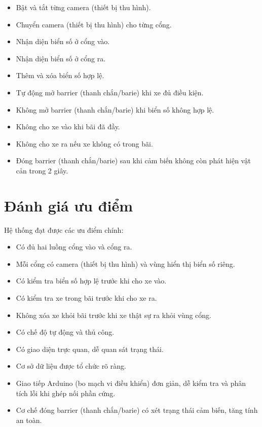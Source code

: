 \documentclass[a4paper,14pt]{extreport}
\begin{document}
\begin{itemize}[leftmargin=2em]
  \item Bật và tắt từng camera (thiết bị thu hình).
  \item Chuyển camera (thiết bị thu hình) cho từng cổng.
  \item Nhận diện biển số ở cổng vào.
  \item Nhận diện biển số ở cổng ra.
  \item Thêm và xóa biển số hợp lệ.
  \item Tự động mở barrier (thanh chắn/barie) khi xe đủ điều kiện.
  \item Không mở barrier (thanh chắn/barie) khi biển số không hợp lệ.
  \item Không cho xe vào khi bãi đã đầy.
  \item Không cho xe ra nếu xe không có trong bãi.
  \item Đóng barrier (thanh chắn/barie) sau khi cảm biến không còn phát hiện vật cản trong 2 giây.
\end{itemize}

\section{Đánh giá ưu điểm}

Hệ thống đạt được các ưu điểm chính:

\begin{itemize}[leftmargin=2em]
  \item Có đủ hai luồng cổng vào và cổng ra.
  \item Mỗi cổng có camera (thiết bị thu hình) và vùng hiển thị biển số riêng.
  \item Có kiểm tra biển số hợp lệ trước khi cho xe vào.
  \item Có kiểm tra xe trong bãi trước khi cho xe ra.
  \item Không xóa xe khỏi bãi trước khi xe thật sự ra khỏi vùng cổng.
  \item Có chế độ tự động và thủ công.
  \item Có giao diện trực quan, dễ quan sát trạng thái.
  \item Cơ sở dữ liệu được tổ chức rõ ràng.
  \item Giao tiếp Arduino (bo mạch vi điều khiển) đơn giản, dễ kiểm tra và phân tích lỗi khi ghép nối phần cứng.
  \item Cơ chế đóng barrier (thanh chắn/barie) có xét trạng thái cảm biến, tăng tính an toàn.
\end{itemize}
\end{document}
